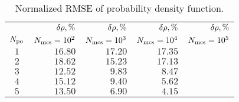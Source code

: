 \begin{table}
  \centering
  \caption{Normalized RMSE of probability density function.}
  \vspace{-10pt}
  \begin{tabular}{crrrr}
    \toprule
    {} & $\delta\rho, \%$ & $\delta\rho, \%$ & $\delta\rho, \%$ & $\delta\rho, \%$ \\
    ${N_\text{po}}$ & $N_\text{mcs} = 10^2$ & $N_\text{mcs} = 10^3$ & $N_\text{mcs} = 10^4$ & $N_\text{mcs} = 10^5$ \\
    \midrule
    $1 $ & $16.80$ & $17.20$ & $17.35$ &  \\
    $2 $ & $18.62$ & $15.23$ & $17.13$ &  \\
    $3 $ & $12.52$ & $ 9.83$ & $ 8.47$ &  \\
    $4 $ & $15.12$ & $ 9.40$ & $ 5.62$ &  \\
    $5 $ & $13.50$ & $ 6.90$ & $ 4.15$ &  \\
    \bottomrule
  \end{tabular}
  \vspace{-10pt}
\end{table}
%
